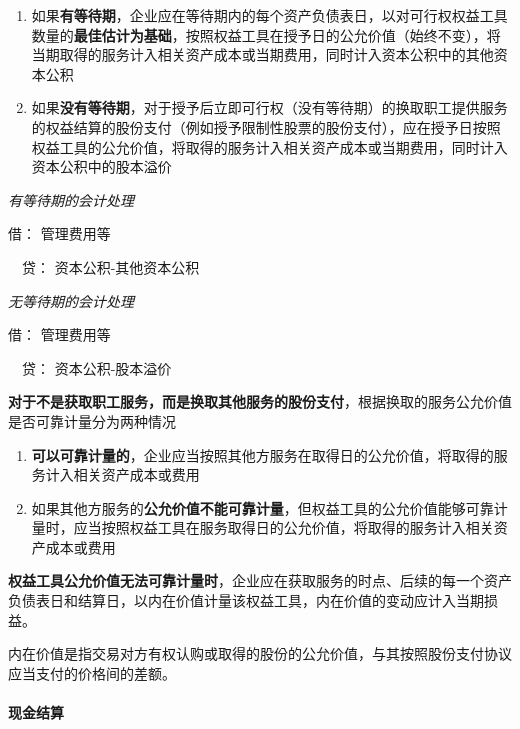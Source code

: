 \documentclass[UTF8,12pt]{ctexart}
\newenvironment{Dr}{\noindent 借：}{\par}
\newenvironment{Cr}{\noindent \ \ 贷：}{\par}
\numberwithin{equation}{section} %
\numberwithin{figure}{section}
\numberwithin{table}{section}
\begin{document}
	\begin{enumerate}
		\item 如果\textbf{有等待期}，企业应在等待期内的每个资产负债表日，以对可行权权益工具数量的\textbf{最佳估计为基础}，按照权益工具在授予日的公允价值（始终不变），将当期取得的服务计入相关资产成本或当期费用，同时计入资本公积中的其他资本公积
		
		\item 如果\textbf{没有等待期}，对于授予后立即可行权（没有等待期）的换取职工提供服务的权益结算的股份支付（例如授予限制性股票的股份支付），应在授予日按照权益工具的公允价值，将取得的服务计入相关资产成本或当期费用，同时计入资本公积中的股本溢价
	\end{enumerate}
	
	\textit{有等待期的会计处理}
	
	\begin{Dr}
		管理费用等
	\end{Dr}
	\begin{Cr}
		资本公积-其他资本公积
	\end{Cr}

	\textit{无等待期的会计处理}
	
	\begin{Dr}
		管理费用等
	\end{Dr}
	\begin{Cr}
		资本公积-股本溢价
	\end{Cr}

	\textbf{对于不是获取职工服务，而是换取其他服务的股份支付}，根据换取的服务公允价值是否可靠计量分为两种情况
	\begin{enumerate}
		\item \textbf{可以可靠计量的}，企业应当按照其他方服务在取得日的公允价值，将取得的服务计入相关资产成本或费用
		
		\item 如果其他方服务的\textbf{公允价值不能可靠计量}，但权益工具的公允价值能够可靠计量时，应当按照权益工具在服务取得日的公允价值，将取得的服务计入相关资产成本或费用
	\end{enumerate}

	\textbf{权益工具公允价值无法可靠计量时}，企业应在获取服务的时点、后续的每一个资产负债表日和结算日，以内在价值计量该权益工具，内在价值的变动应计入当期损益。
	
	内在价值是指交易对方有权认购或取得的股份的公允价值，与其按照股份支付协议应当支付的价格间的差额。
	
	\paragraph{现金结算}
	
\end{document}
